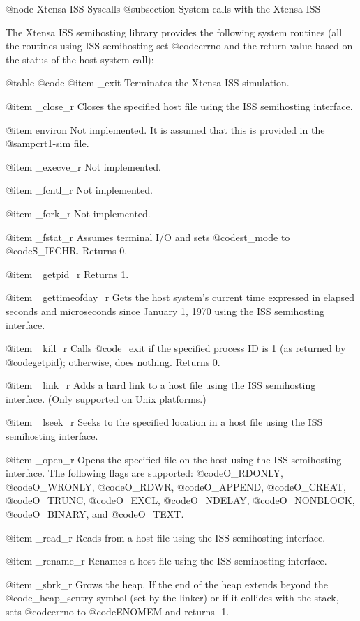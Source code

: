 @node Xtensa ISS Syscalls
@subsection System calls with the Xtensa ISS

The Xtensa ISS semihosting library provides the following
system routines (all the routines using ISS semihosting set @code{errno}
and the return value based on the status of the host system call):

@table @code
@item _exit
Terminates the Xtensa ISS simulation.

@item _close_r
Closes the specified host file using the ISS semihosting interface.

@item environ
Not implemented.  It is assumed that this is provided in the
@samp{crt1-sim} file.

@item _execve_r
Not implemented.

@item _fcntl_r
Not implemented.

@item _fork_r
Not implemented.

@item _fstat_r
Assumes terminal I/O and sets @code{st_mode} to @code{S_IFCHR}.
Returns 0.

@item _getpid_r
Returns 1.

@item _gettimeofday_r
Gets the host system's current time expressed in elapsed seconds and
microseconds since January 1, 1970 using the ISS semihosting interface.

@item _kill_r
Calls @code{_exit} if the specified process ID is 1 (as returned by
@code{getpid}); otherwise, does nothing.  Returns 0.

@item _link_r
Adds a hard link to a host file using the ISS semihosting interface.
(Only supported on Unix platforms.)

@item _lseek_r
Seeks to the specified location in a host file using the ISS semihosting 
interface.

@item _open_r
Opens the specified file on the host using the ISS semihosting
interface.  The following flags are supported: @code{O_RDONLY},
@code{O_WRONLY}, @code{O_RDWR}, @code{O_APPEND}, @code{O_CREAT},
@code{O_TRUNC}, @code{O_EXCL}, @code{O_NDELAY}, @code{O_NONBLOCK},
@code{O_BINARY}, and @code{O_TEXT}.

@item _read_r
Reads from a host file using the ISS semihosting interface.

@item _rename_r
Renames a host file using the ISS semihosting interface.

@item _sbrk_r
Grows the heap.  If the end of the heap extends beyond the
@code{_heap_sentry} symbol (set by the linker) or if it collides with
the stack, sets @code{errno} to @code{ENOMEM} and returns -1.

